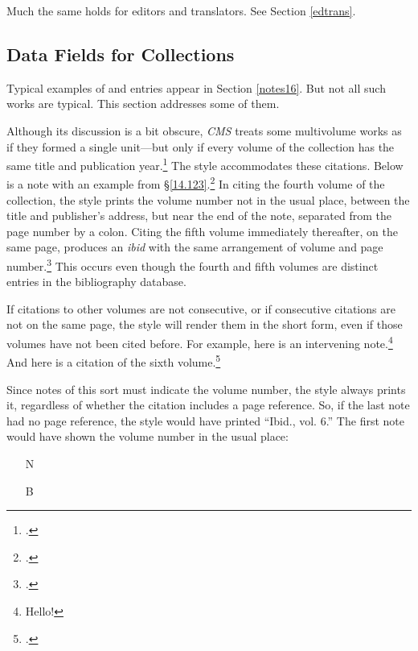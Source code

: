 \documentclass[11pt,letterpaper,oneside]{article}
\begin{document}
\noindent Much the same holds for editors and translators. See Section
\ref{edtrans}.

\subsection{Data Fields for Collections}
\label{collect}

Typical examples of  and 
entries appear in Section \ref{notes16}. But not all such works are
typical. This section addresses some of them.

Although its discussion is a bit obscure, \textit{CMS} treats some
multivolume works as if they formed a single unit---but only if every
volume of the collection has the same title and publication
year.\footcite[See the examples of short citations in \S14.29 and
\S\S14.122--14.125]{chicago2010} The style accommodates these
citations. Below is a note with an example from
\S\ref{14.123}.\footcite[243]{byrne1981.4} In citing the fourth volume
of the collection, the style prints the volume number not in the usual
place, between the title and publisher's address, but near the end of
the note, separated from the page number by a colon. Citing the fifth
volume immediately thereafter, on the same page, produces an
\textit{ibid} with the same arrangement of volume and page
number.\footcite[91]{byrne1981.5} This occurs even though the fourth
and fifth volumes are distinct entries in the bibliography database.

If citations to other volumes are not consecutive, or if consecutive
citations are not on the same page, the style will render them in the
short form, even if those volumes have not been cited before. For
example, here is an intervening note.\footnote{Hello!} And here is a
citation of the sixth volume.\footcite[23--32]{byrne1981.6}

Since notes of this sort must indicate the volume number, the style
always prints it, regardless of whether the citation includes a page
reference. So, if the last note had no page reference, the style would
have printed ``Ibid., vol. 6.'' The first note would have shown the
volume number in the usual place:

\begin{itemize}
\item[N] 

\item[B] 
\end{itemize}
\end{document}
